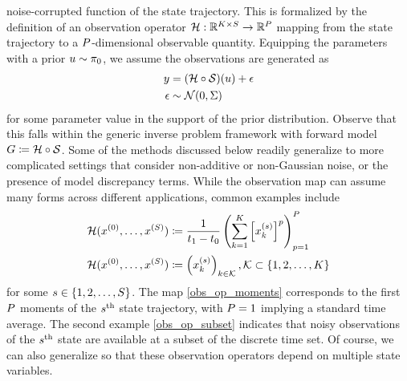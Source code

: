 \documentclass[12pt]{article}
\begin{document}
noise-corrupted function of the state trajectory. This is formalized by the definition of an observation operator 
$\obsOp: \R^{\NTimeStep \times \dimState} \to \R^{\dimObs}$ mapping from the state trajectory to a 
$\dimObs$-dimensional observable quantity. Equipping the parameters with a prior $\Par \sim \priorDens$,
we assume the observations are generated as 
\begin{align}
\obs &= (\obsOp \circ \solutionOp)(\Par) + \noise \nonumber \\
\noise &\sim \Gaussian(0, \likPar) \nonumber 
\end{align}
for some parameter value in the support of the prior distribution. Observe that this falls within the generic 
inverse problem framework with forward model $\fwd \Def \obsOp \circ \solutionOp$. 
Some of the methods discussed below readily 
generalize to more complicated settings that consider non-additive or non-Gaussian noise, or the presence of 
model discrepancy terms. While the observation map can assume many forms across different applications, 
common examples include 
\begin{align}
\obsOp(\indexState[0]{\state}, \dots, \indexState[\dimState]{\state}) 
&\Def \frac{1}{\timeEnd - \timeStart} \left(\sum_{\timeIndex=1}^{\NTimeStep} \left[\state^{(\stateIndex)}_{\timeIndex} \right]^{\idxObsDim} \right)_{\idxObsDim=1}^{\dimObs} \label{obs_op_moments} \\ 
\obsOp(\indexState[0]{\state}, \dots, \indexState[\dimState]{\state}) 
&\Def \left(\state^{(\stateIndex)}_{\timeIndex} \right)_{\timeIndex \in \mathcal{K}}, \mathcal{K} \subset \{1, 2, \dots, \NTimeStep\} \label{obs_op_subset}
\end{align} 
for some $\stateIndex \in \{1, 2, \dots, \dimState\}$. The map \ref{obs_op_moments} corresponds to the first $\dimObs$ moments of the 
$\stateIndex^{\text{th}}$ state trajectory, with $\dimObs=1$ implying a standard time average. The second example \ref{obs_op_subset}
indicates that noisy observations of the $\stateIndex^{\text{th}}$ state are available at a subset of the discrete time set. 
Of course, we can also generalize so that these observation operators depend on multiple state variables. 

\end{document}
